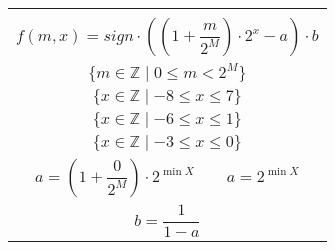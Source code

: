 \documentclass[12pt]{standalone}
\begin{document}
    \begin{minipage}{9cm}

        \begin{tabular}{|c|}
        \hline
        \\

            \vbox{\begin{equation*}
            f(m, x) = sign \cdot ((1 + \frac{m}{2^{M}}) \cdot 2^{x} - a) \cdot b
            \end{equation*}}

        \\

            \vbox{\begin{equation*}
            \{ m \in \mathbb{Z} \mid 0 \leq m < 2^{M} \}
            \end{equation*}}

        \\

            \vbox{\begin{equation*}\tag{4 bits}
            \{ x \in \mathbb{Z} \mid -8 \leq x \leq 7 \}
            \end{equation*}}

        \\

            \vbox{\begin{equation*}\tag{3 bits}
            \{ x \in \mathbb{Z} \mid -6 \leq x \leq 1 \}
            \end{equation*}}

        \\

            \vbox{\begin{equation*}\tag{2 bits}
            \{ x \in \mathbb{Z} \mid -3 \leq x \leq 0 \}
            \end{equation*}}

        \\

            \vbox{\begin{equation*}
            a = (1 + \frac{0}{2^{M}}) \cdot 2^{\min{X}}
            \quad \quad
            a = 2^{\min{X}}
            \end{equation*}}

        \\

            \vbox{\begin{equation*}
            b = \frac{1}{1 - a}
            \end{equation*}}

        \\
        \hline
        \end{tabular}

    \end{minipage}
\end{document}

